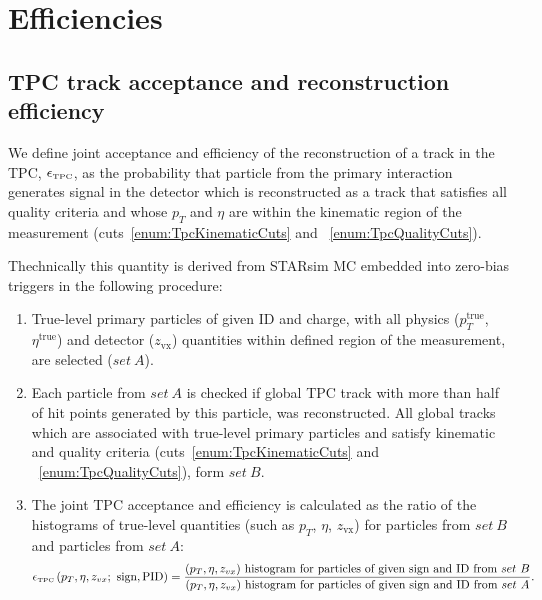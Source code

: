 

\chapter{Efficiencies}\label{chap:efficiencies}

\section{TPC track acceptance and reconstruction efficiency}\label{sec:tpcRecoEff}
We define joint acceptance and efficiency of the reconstruction of a track in the TPC, $\epsilon_{\textrm{\tiny TPC}}$, as the probability that particle from the primary interaction generates signal in the detector which is reconstructed as a track that satisfies all quality criteria and whose $p_{T}$ and $\eta$ are within the kinematic region of the measurement (cuts~\ref{enum:TpcKinematicCuts} and ~\ref{enum:TpcQualityCuts}).

Thechnically this quantity is derived from STARsim MC embedded into zero-bias triggers in the following procedure:
\begin{enumerate}
	\item True-level primary particles of given ID and charge, with all physics ($p_{T}^{\textrm{true}}$, $\eta^{\textrm{true}}$) and detector ($z_{\textrm{vx}}$) quantities within defined region of the measurement, are selected ($set~A$).
	\item Each particle from $set~A$ is checked if global TPC track with more than half of hit points generated by this particle, was reconstructed. All global tracks which are associated with true-level primary particles and satisfy kinematic and quality criteria (cuts~\ref{enum:TpcKinematicCuts} and ~\ref{enum:TpcQualityCuts}), form $set~B$.
	\item The joint TPC acceptance and efficiency is calculated as the ratio of the histograms of true-level quantities (such as $p_{T}$, $\eta$, $z_{\textrm{vx}}$) for particles from $set~B$ and particles from $set~A$:
	\begin{equation}\label{eq:tpcAccAndEffDefinition}
		\epsilon_{\textrm{\tiny TPC}}\left(p_{T}, \eta, z_{vx};~\textrm{sign},\textrm{PID}\right) = \frac{(p_{T},\eta, z_{vx})~\textrm{histogram for particles of given sign and ID from}~set~B}{(p_{T},\eta, z_{vx})~\textrm{histogram for particles of given sign and ID from}~set~A}.
	\end{equation}

\end{enumerate}


